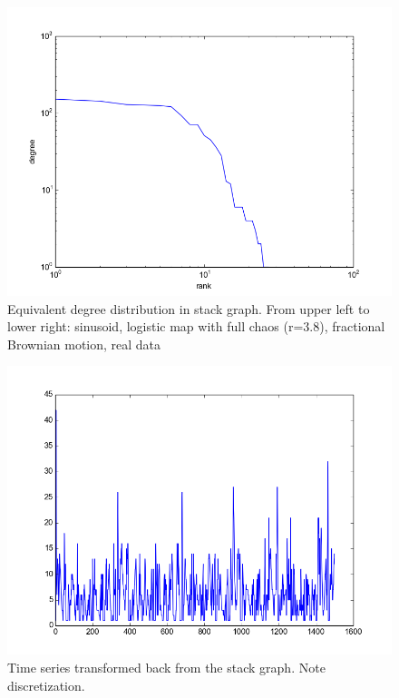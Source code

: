 \documentclass[12pt]{article}
\begin{document}
\begin{figure}
\begin{center}
    \includegraphics[scale=0.4]{degrees_vr}
  \end{center}
  \caption{Equivalent degree distribution in stack graph. From upper left to lower right: sinusoid, logistic map with full chaos (r=3.8), fractional Brownian motion, real data}
\end{figure}
\begin{figure}\label{fig:resampled_stack}
  \begin{center}
    \includegraphics[scale=0.6]{resampled_stack}
  \end{center}
  \caption{Time series transformed back from the stack graph. Note discretization.}
\end{figure}
\end{document}
